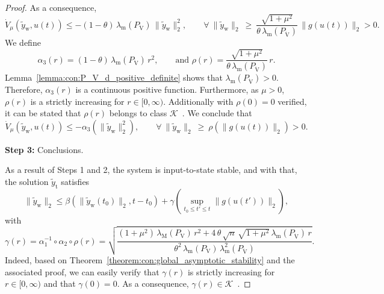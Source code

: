 \begin{proof}
    As a consequence,
    \begin{equation}
        \dot{V}_\mu(\tilde{y}_\mathrm{w}, u(t)) \leq -(1-\theta) \, \lambda_\mathrm{m}\left(P_{\dot{\mathrm{V}}} \right) \, \lVert \tilde{y}_\mathrm{w} \rVert_2^2, %
        \qquad
        \forall \: \lVert \tilde{y}_\mathrm{w} \rVert_2 \: \geq \: \frac{\sqrt{1+\mu^2}}{\theta \, \lambda_\mathrm{m}\left(P_{\dot{\mathrm{V}}} \right)} \, \lVert g(u(t)) \rVert_2  > 0.
    \end{equation}
    We define
    \begin{equation}
        \alpha_3(r) = (1-\theta) \, \lambda_\mathrm{m}\left(P_{\dot{\mathrm{V}}} \right) \, r^2,
        \qquad
        \text{and }
        \rho(r) = \frac{\sqrt{1+\mu^2}}{\theta \, \lambda_\mathrm{m}\left(P_{\dot{\mathrm{V}}} \right)} \, r.
    \end{equation}
    Lemma~\ref{lemma:con:P_V_d_positive_definite} shows that $\lambda_\mathrm{m}\left(P_{\dot{\mathrm{V}}} \right) > 0$. Therefore, $\alpha_3(r)$ is a continuous positive function. Furthermore, as $\mu > 0$, $\rho(r)$ is a strictly increasing for $r \in [0, \infty)$. Additionally with $\rho(0) = 0$ verified, it can be stated that $\rho(r)$ belongs to class $\mathcal{K}$~\citep{khalil2002nonlinear}.
    We conclude that
    \begin{equation}
        \dot{V}_\mu(\tilde{y}_\mathrm{w}, u(t)) \leq - \alpha_3 \left (\lVert \tilde{y}_\mathrm{w} \rVert_2^2 \right ),
        \qquad
        \forall \: \lVert \tilde{y}_\mathrm{w} \rVert_2 \: \geq \: \rho \left ( \lVert g(u(t)) \rVert_2 \right )  > 0.
    \end{equation}

    \textbf{Step 3:} Conclusions.

    As a result of Steps 1 and 2, the system is input-to-state stable, and with that, the solution $\tilde{y}_\mathrm{t}$ satisfies~\citep{khalil2002nonlinear}
    \begin{equation}
        \lVert \tilde{y}_\mathrm{w} \rVert_2 \leq \beta \left (\lVert \tilde{y}_\mathrm{w}(t_0) \rVert_2, t-t_0 \right ) + \gamma \left ( \sup_{t_0 \leq t' \leq t} \lVert g(u(t')) \rVert_2 \right ),
    \end{equation}
    with
    \begin{equation}
        \gamma(r) = \alpha_1^{-1} \circ \alpha_2 \circ \rho(r) = \sqrt{\frac{(1+\mu^2) \, \lambda_\mathrm{M}(P_\mathrm{V}) \, r^2 + 4 \, \theta \, \sqrt{n} \, \sqrt{1+\mu^2} \, \lambda_\mathrm{m}(P_{\dot{\mathrm{V}}}) \, r}{\theta^2 \, \lambda_\mathrm{m}(P_\mathrm{V}) \, \lambda_\mathrm{m}^2(P_{\dot{\mathrm{V}}})}}.
    \end{equation}
    Indeed, based on Theorem~\ref{theorem:con:global_asymptotic_stability} and the associated proof, we can easily verify that $\gamma(r)$ is strictly increasing for $r \in [0, \infty)$ and that $\gamma(0) = 0$. As a consequence, $\gamma(r) \in \mathcal{K}$~\citep{khalil2002nonlinear}.
\end{proof}